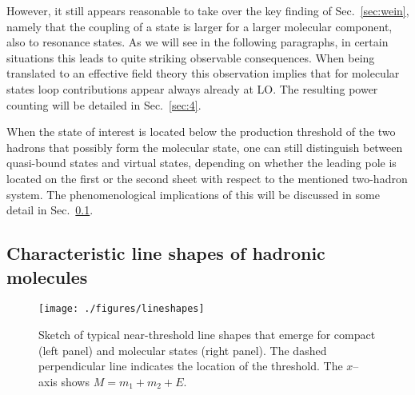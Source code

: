 However, it still appears reasonable to take over the key finding of
Sec.~\ref{sec:wein}, namely that the coupling of a state is larger for a larger
molecular component, also to resonance states.
As we will see in the following paragraphs, in certain situations this leads to
quite striking observable consequences. When being translated to an effective
field theory this observation implies that for molecular states loop
contributions appear always already at LO. The resulting power
counting will be detailed in Sec.~\ref{sec:4}.

When the state of interest is located below the production threshold of the
two hadrons that possibly form the molecular state, one can still distinguish
between quasi-bound states and virtual states, depending on whether the leading
pole is located on the first or the second sheet with respect to the mentioned
two-hadron system. The phenomenological implications of this will be discussed
in some detail in Sec.~\ref{sec:lineshapes}.



\subsection{Characteristic line shapes of hadronic molecules}
\label{sec:lineshapes}


\begin{figure} 
 \centering
   \texttt{[image: ./figures/lineshapes]}
   \caption{Sketch of typical near-threshold line shapes that emerge for compact
   (left panel) and molecular states (right panel). The dashed perpendicular line
   indicates the location of the threshold. The $x$--axis shows $M=m_1+m_2+E$.}\label{fig:lineshapes}
\end{figure}

